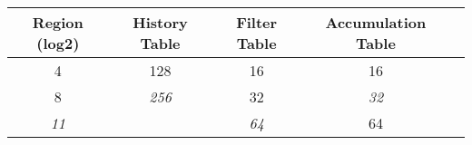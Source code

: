 \begin{table}[htbp]
  \caption{\emph{}}
  \centering
  \begin{tabular}{|c|c|c|c|c|}
    \hline
    \textbf{Region (log2)} & \textbf{History Table} & \textbf{Filter Table} & \textbf{Accumulation Table} \\ \hline
    4  & 128 & 16 & 16 \\ \hline
    8  & \emph{256} & 32&  \emph{32}\\ \hline
    \emph{11} &     & \emph{64}&  64\\ \hline
  \end{tabular}
  \label{tab:smssettings}
\end{table}







